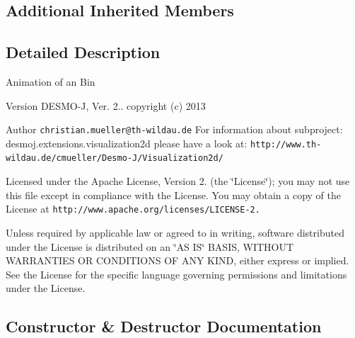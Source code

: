 \subsection*{Additional Inherited Members}


\subsection{Detailed Description}
Animation of an Bin

\begin{DoxyVersion}{Version}
D\-E\-S\-M\-O-\/\-J, Ver. 2.. copyright (c) 2013 
\end{DoxyVersion}
\begin{DoxyAuthor}{Author}
{\tt christian.\-mueller@th-\/wildau.\-de} For information about subproject\-: desmoj.\-extensions.\-visualization2d please have a look at\-: {\tt http\-://www.\-th-\/wildau.\-de/cmueller/\-Desmo-\/\-J/\-Visualization2d/}
\end{DoxyAuthor}
Licensed under the Apache License, Version 2. (the \char`\"{}\-License\char`\"{}); you may not use this file except in compliance with the License. You may obtain a copy of the License at {\tt http\-://www.\-apache.\-org/licenses/\-L\-I\-C\-E\-N\-S\-E-\/2.}

Unless required by applicable law or agreed to in writing, software distributed under the License is distributed on an \char`\"{}\-A\-S I\-S\char`\"{} B\-A\-S\-I\-S, W\-I\-T\-H\-O\-U\-T W\-A\-R\-R\-A\-N\-T\-I\-E\-S O\-R C\-O\-N\-D\-I\-T\-I\-O\-N\-S O\-F A\-N\-Y K\-I\-N\-D, either express or implied. See the License for the specific language governing permissions and limitations under the License. 

\subsection{Constructor \& Destructor Documentation}
